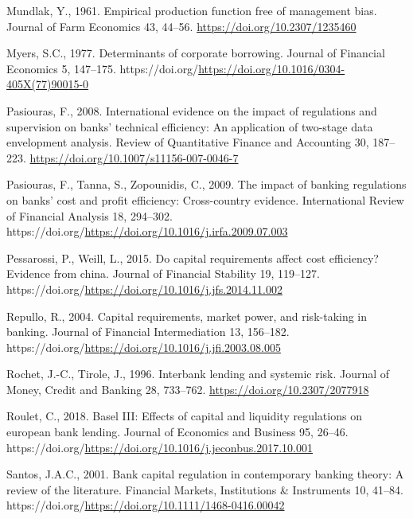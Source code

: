 \documentclass[
  12pt,
  a4paper,
]{scrreprt}
\newlength{\cslhangindent}
\newenvironment{CSLReferences}[2] %
 {\begin{list}{}{%
  \setlength{\itemindent}{0pt}
  \setlength{\leftmargin}{0pt}
  \setlength{\parsep}{0pt}
  \ifodd #1
   \setlength{\leftmargin}{\cslhangindent}
   \setlength{\itemindent}{-1\cslhangindent}
  \fi
  \setlength{\itemsep}{#2\baselineskip}}}
 {\end{list}}
\begin{document}
{{{{\begin{CSLReferences}{1}{0}
Mundlak, Y., 1961. Empirical production function free of management
bias. Journal of Farm Economics 43, 44--56.
\url{https://doi.org/10.2307/1235460}

Myers, S.C., 1977. Determinants of corporate borrowing. Journal of
Financial Economics 5, 147--175.
https://doi.org/\url{https://doi.org/10.1016/0304-405X(77)90015-0}

Pasiouras, F., 2008. International evidence on the impact of regulations
and supervision on banks' technical efficiency: An application of
two-stage data envelopment analysis. Review of Quantitative Finance and
Accounting 30, 187--223. \url{https://doi.org/10.1007/s11156-007-0046-7}

Pasiouras, F., Tanna, S., Zopounidis, C., 2009. The impact of banking
regulations on banks' cost and profit efficiency: Cross-country
evidence. International Review of Financial Analysis 18, 294--302.
https://doi.org/\url{https://doi.org/10.1016/j.irfa.2009.07.003}

Pessarossi, P., Weill, L., 2015. Do capital requirements affect cost
efficiency? Evidence from china. Journal of Financial Stability 19,
119--127.
https://doi.org/\url{https://doi.org/10.1016/j.jfs.2014.11.002}

Repullo, R., 2004. Capital requirements, market power, and risk-taking
in banking. Journal of Financial Intermediation 13, 156--182.
https://doi.org/\url{https://doi.org/10.1016/j.jfi.2003.08.005}

Rochet, J.-C., Tirole, J., 1996. Interbank lending and systemic risk.
Journal of Money, Credit and Banking 28, 733--762.
\url{https://doi.org/10.2307/2077918}

Roulet, C., 2018. Basel III: Effects of capital and liquidity
regulations on european bank lending. Journal of Economics and Business
95, 26--46.
https://doi.org/\url{https://doi.org/10.1016/j.jeconbus.2017.10.001}

Santos, J.A.C., 2001. Bank capital regulation in contemporary banking
theory: A review of the literature. Financial Markets, Institutions \&
Instruments 10, 41--84.
https://doi.org/\url{https://doi.org/10.1111/1468-0416.00042}


\end{CSLReferences}}}}}
\end{document}

